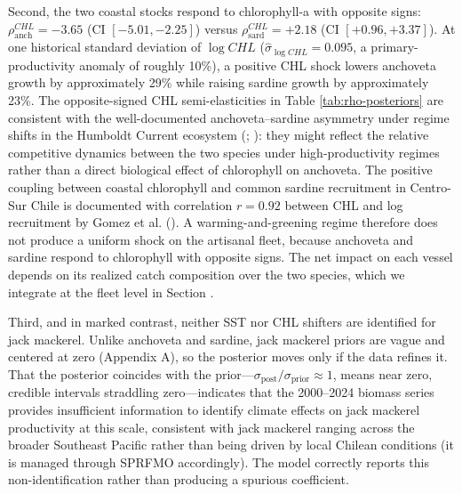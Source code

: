 \documentclass[
  11pt,
]{article}
\begin{document}
Second, the two coastal stocks respond to chlorophyll-a with opposite signs: \(\rho^{CHL}_{\text{anch}} = -3.65\) (CI \([-5.01, -2.25]\)) versus
\(\rho^{CHL}_{\text{sard}} = +2.18\) (CI \([+0.96, +3.37]\)). At one historical
standard deviation of \(\log CHL\) (\(\hat{\sigma}_{\log CHL} = 0.095\), a
primary-productivity anomaly of roughly 10\%), a positive CHL shock lowers
anchoveta growth by approximately 29\% while raising sardine growth by
approximately 23\%. The opposite-signed CHL semi-elasticities in Table \ref{tab:rho-posteriors} are consistent with the well-documented anchoveta--sardine asymmetry under regime shifts in the Humboldt Current ecosystem (; ): they might reflect the relative competitive dynamics between the two species under high-productivity regimes rather than a direct biological effect of chlorophyll on anchoveta. The positive coupling between coastal chlorophyll and common sardine recruitment in Centro-Sur Chile is documented with correlation \(r=0.92\) between CHL and log recruitment by Gomez et al. (). A warming-and-greening regime
therefore does not produce a uniform shock on the artisanal fleet,
because anchoveta and sardine respond to chlorophyll with opposite signs.
The net impact on each vessel depends on its realized catch composition
over the two species, which we integrate at the fleet level in Section
\emph{}.

Third, and in marked contrast, neither SST nor CHL shifters are identified for jack mackerel. Unlike anchoveta and sardine, jack mackerel priors are vague and centered at zero (Appendix A), so the posterior moves only if the data refines it. That the posterior coincides with the prior---\(\sigma_{\text{post}}/\sigma_{\text{prior}} \approx 1\), means near zero, credible intervals straddling zero---indicates that the 2000--2024 biomass series provides insufficient information to identify climate effects on jack mackerel productivity at this scale, consistent with jack mackerel ranging across the broader Southeast Pacific rather than being driven by local Chilean conditions (it is managed through SPRFMO accordingly). The model correctly reports this non-identification rather than producing a spurious coefficient.
\end{document}
